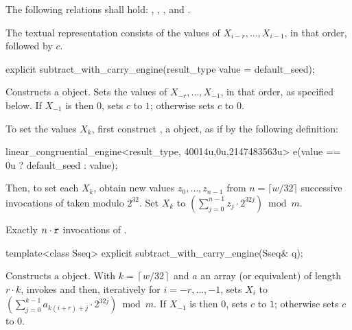\pnum
The following relations shall hold:
  ,
  ,
  ,
and
  .

\pnum
The textual representation%
%
consists of the values of
 $X_{i-r}, \ldots, X_{i-1}$,
in that order, followed by $c$.


%
\begin{itemdecl}
explicit subtract_with_carry_engine(result_type value = default_seed);
\end{itemdecl}

\begin{itemdescr}
\pnum\effects Constructs a  object.
 Sets the values of
 $ X_{-r}, \ldots, X_{-1} $,
 in that order, as specified below.
 If $X_{-1}$ is then $0$,
 sets $c$ to $1$;
 otherwise sets $c$ to $0$.

 To set the values $X_k$,
 first construct , a  object,
 as if by the following definition:
\begin{codeblock}
linear_congruential_engine<result_type,
                          40014u,0u,2147483563u> e(value == 0u ? default_seed : value);
\end{codeblock}
 Then, to set each $X_k$,
 obtain new values $ z_0, \ldots, z_{n-1} $
 from $n = \lceil w/32 \rceil $ successive invocations
 of  taken modulo $2^{32}$.
 Set $X_k$ to $ \left( \sum_{j=0}^{n-1} z_j \cdot 2^{32j}\right) \bmod m$.

\pnum\complexity Exactly $n \cdot \texttt{r}$ invocations
 of .
\end{itemdescr}



%
\begin{itemdecl}
template<class Sseq> explicit subtract_with_carry_engine(Sseq& q);
\end{itemdecl}

\begin{itemdescr}
\pnum\effects Constructs a  object.
 With
 $ k = \left\lceil w / 32 \right\rceil $
 and $a$ an array (or equivalent)
 of length $ r \cdot k $,
 invokes 
 and then, iteratively for $i = -r, \ldots, -1$,
 sets $X_i$
 to $ \left(\sum_{j=0}^{k-1}a_{k(i+r)+j} \cdot 2^{32j} \right) \bmod m $.
 If $X_{-1}$ is then $0$,
 sets $c$ to $1$;
 otherwise sets $c$ to $0$.
\end{itemdescr}


